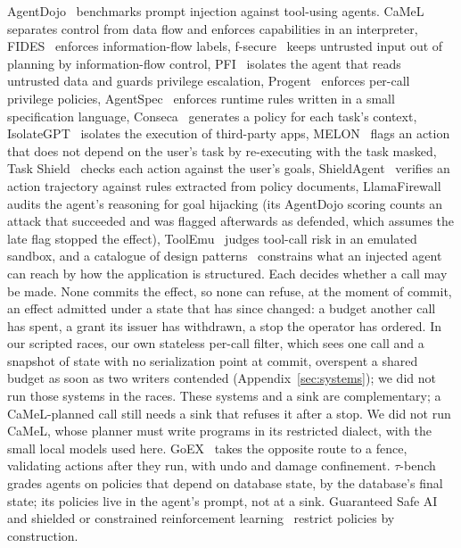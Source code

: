  AgentDojo~\cite{debenedetti2024agentdojo,agentdojo} benchmarks prompt injection against tool-using agents. CaMeL~\cite{camel} separates control from data flow and enforces capabilities in an interpreter, FIDES~\cite{costa2025fides} enforces information-flow labels, f-secure~\cite{wu2024fsecure} keeps untrusted input out of planning by information-flow control, PFI~\cite{kim2025pfi} isolates the agent that reads untrusted data and guards privilege escalation, Progent~\cite{progent} enforces per-call privilege policies, AgentSpec~\cite{agentspec} enforces runtime rules written in a small specification language, Conseca~\cite{conseca} generates a policy for each task's context, IsolateGPT~\cite{isolategpt} isolates the execution of third-party apps, MELON~\cite{melon} flags an action that does not depend on the user's task by re-executing with the task masked, Task Shield~\cite{taskshield} checks each action against the user's goals, ShieldAgent~\cite{chen2025shieldagent} verifies an action trajectory against rules extracted from policy documents, LlamaFirewall~\cite{chennabasappa2025llamafirewall} audits the agent's reasoning for goal hijacking (its AgentDojo scoring counts an attack that succeeded and was flagged afterwards as defended, which assumes the late flag stopped the effect), ToolEmu~\cite{ruan2023toolemu} judges tool-call risk in an emulated sandbox, and a catalogue of design patterns~\cite{beurerkellner2025patterns} constrains what an injected agent can reach by how the application is structured. Each decides whether a call may be made. None commits the effect, so none can refuse, at the moment of commit, an effect admitted under a state that has since changed: a budget another call has spent, a grant its issuer has withdrawn, a stop the operator has ordered. In our scripted races, our own stateless per-call filter, which sees one call and a snapshot of state with no serialization point at commit, overspent a shared budget as soon as two writers contended (Appendix~\ref{sec:systems}); we did not run those systems in the races. These systems and a sink are complementary; a CaMeL-planned call still needs a sink that refuses it after a stop. We did not run CaMeL, whose planner must write programs in its restricted dialect, with the small local models used here. GoEX~\cite{goex} takes the opposite route to a fence, validating actions after they run, with undo and damage confinement. \(\tau\)-bench~\cite{taubench} grades agents on policies that depend on database state, by the database's final state; its policies live in the agent's prompt, not at a sink. Guaranteed Safe AI~\cite{gsai} and shielded or constrained reinforcement learning~\cite{shield,cpo} restrict policies by construction.

